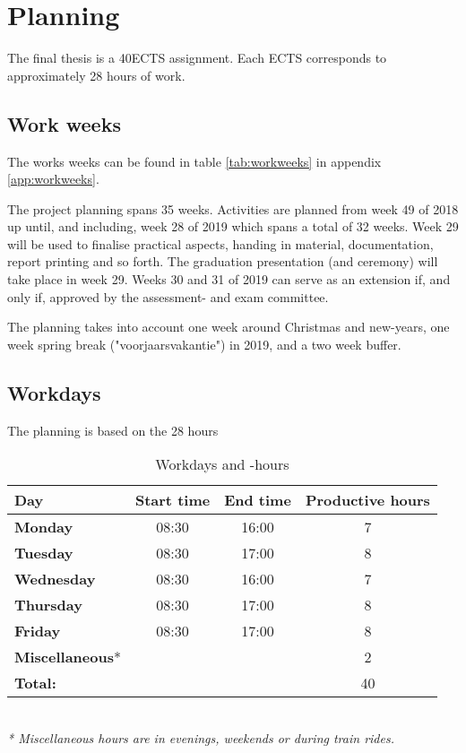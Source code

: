 \chapter{Planning}
\label{ch:Planning}

The final thesis is a 40ECTS assignment. Each ECTS corresponds to approximately 28 hours of work.
\section{Work weeks}
The works weeks can be found in table \ref{tab:workweeks} in appendix \ref{app:workweeks}.

The project planning spans 35 weeks. Activities are planned from week 49 of 2018 up until, and including, week 28 of 2019 which spans a total of 32 weeks. Week 29 will be used to finalise practical aspects, handing in material, documentation, report printing and so forth. The graduation presentation (and ceremony) will take place in week 29. Weeks 30 and 31 of 2019 can serve as an extension if, and only if, approved by the assessment- and exam committee.

The planning takes into account one week around Christmas and new-years, one week spring break ("voorjaarsvakantie") in 2019, and a two week buffer.

\section{Workdays}
The planning is based on the 28 hours
\begin{table} [h!]
	\begin{tabular}{l|ccc}
		\textbf{Day} 	&	Start time 		&	End time	&	Productive hours \\
		\hline
		\textbf{Monday} 		&	08:30	&	16:00	& 7 \\
		\rowcolor{Gray}
		\textbf{Tuesday} 	&	08:30 	&	17:00	& 8 \\
		\textbf{Wednesday} 	&	08:30	&	16:00	& 7 \\
		\rowcolor{Gray}
		\textbf{Thursday}	&	08:30	&	17:00	& 8 \\
		\textbf{Friday}		&	08:30	&	17:00	& 8 \\
		\rowcolor{Gray}
		\textbf{Miscellaneous}* & 		& 			& 2 \\
		\hline
		\textbf{Total:} 	&			&			& 40\\
	\end{tabular} \\
	\textit{* Miscellaneous hours are in evenings, weekends or during train rides.}
	\caption{Workdays and -hours}
	\label{tab:workdays}
\end{table}

